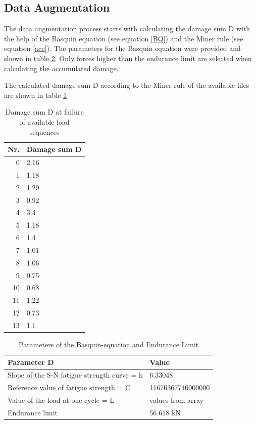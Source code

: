 \subsection{Data Augmentation}
The data augmentation process starts with calculating the damage sum D with the help of the Basquin equation (see equation \ref{BQ}) and the Miner rule (see equation \ref{acc}).
The parameters for the Basquin equation were provided and shown in table \ref{paramBQ}.
Only forces higher than the endurance limit are selected when calculating the accumulated damage.  

The calculated damage sum D according to the Miner-rule of the available files are shown in table \ref{DamageSUMS}


\begin{table}
	\begin{center}
		\begin{tabular}{|| r | l ||}
			\hline
			\rule{0pt}{2ex}Nr. & Damage sum D\\
			\hline
			\hline
			\rule{0pt}{2ex}0 & 2.16\\ \hline
			1 & 1.18\\	\hline
			2 & 1.29 \\ \hline
			3 & 0.92\\ \hline
			4 & 3.4 \\ \hline
			5 & 1.18 \\ \hline
			6 & 1.4 \\ \hline
			7 & 1.01 \\ \hline
			8 & 1.06 \\ \hline
			9 & 0.75 \\ \hline
			10 & 0.68 \\ \hline
			11 & 1.22\\ \hline
			12 & 0.73 \\ \hline
			13 & 1.1 \\ \hline
			\hline
		\end{tabular}
		\caption{Damage sum D at failure of available load sequences}
		\label{DamageSUMS}
	\end{center}
	\vspace{-4mm}
\end{table}


\begin{table}
	\begin{center}
		\begin{tabular}{|| l | l ||}
			\hline
			\rule{0pt}{2ex}Parameter D & Value\\
			\hline
			\hline
			\rule{0pt}{2ex}Slope of the S-N fatigue strength curve = k & 6.33048\\ \hline
			Reference value of fatigue strength = C & 11670367740000000\\	\hline
			Value of the load at one cycle = L & values from array \\ \hline
			Endurance limit & 56.618 kN \\ \hline
			\hline
		\end{tabular}
		\caption{Parameters of the Basquin-equation and Endurance Limit}
		\label{paramBQ}
	\end{center}
	\vspace{-4mm}
\end{table}

